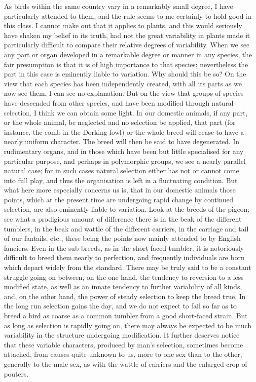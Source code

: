 As birds within the same country vary in a remarkably small degree, I have particularly attended to them, and the rule seems to me certainly to hold good in this class. I cannot make out that it applies to plants, and this would seriously have shaken my belief in its truth, had not the great variability in plants made it particularly difficult to compare their relative degrees of variability.
When we see any part or organ developed in a remarkable degree or manner in any species, the fair presumption is that it is of high importance to that species; nevertheless the part in this case is eminently liable to variation. Why should this be so? On the view that each species has been independently created, with all its parts as we now see them, I can see no explanation. But on the view that groups of species have descended from other species, and have been modified through natural selection, I think we can obtain some light. In our domestic animals, if any part, or the whole animal, be neglected and no selection be applied, that part (for instance, the comb in the Dorking fowl) or the whole breed will cease to have a nearly uniform character. The breed will then be said to have degenerated. In rudimentary organs, and in those which have been but little specialised for any particular purpose, and perhaps in polymorphic groups, we see a nearly parallel natural case; for in such cases natural selection either has not or cannot come into full play, and thus the organisation is left in a fluctuating condition. But what here more especially concerns us is, that in our domestic animals those points, which at the present time are undergoing rapid change by continued selection, are also eminently liable to variation. Look at the breeds of the pigeon; see what a prodigious amount of difference there is in the beak of the different tumblers, in the beak and wattle of the different carriers, in the carriage and tail of our fantails, etc., these being the points now mainly attended to by English fanciers. Even in the sub-breeds, as in the short-faced tumbler, it is notoriously difficult to breed them nearly to perfection, and frequently individuals are born which depart widely from the standard. There may be truly said to be a constant struggle going on between, on the one hand, the tendency to reversion to a less modified state, as well as an innate tendency to further variability of all kinds, and, on the other hand, the power of steady selection to keep the breed true. In the long run selection gains the day, and we do not expect to fail so far as to breed a bird as coarse as a common tumbler from a good short-faced strain. But as long as selection is rapidly going on, there may always be expected to be much variability in the structure undergoing modification. It further deserves notice that these variable characters, produced by man's selection, sometimes become attached, from causes quite unknown to us, more to one sex than to the other, generally to the male sex, as with the wattle of carriers and the enlarged crop of pouters.
